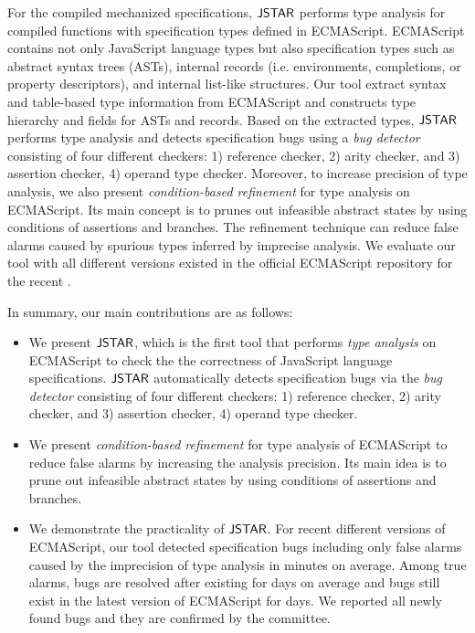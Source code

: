 For the compiled mechanized specifications, $\textsf{JSTAR}$ performs type analysis for
compiled functions with specification types defined in ECMAScript.  ECMAScript
contains not only JavaScript language types but also specification types such as
abstract syntax trees (ASTs), internal records (i.e. environments, completions,
or property descriptors), and internal list-like structures.  Our tool extract
syntax and table-based type information from ECMAScript and constructs type
hierarchy and fields for ASTs and records.  Based on the extracted types,
$\textsf{JSTAR}$ performs type analysis and detects specification bugs using a
\textit{bug detector} consisting of four different checkers: 1) reference
checker, 2) arity checker, and 3) assertion checker, 4) operand type checker.
Moreover, to increase precision of type analysis, we also present
\textit{condition-based refinement} for type analysis on ECMAScript. Its main
concept is to prunes out infeasible abstract states by using conditions of
assertions and branches.  The refinement technique can reduce false alarms
caused by spurious types inferred by imprecise analysis.  We evaluate our tool
with all  different versions existed in the official ECMAScript
repository for the recent .

In summary, our main contributions are as follows:
\begin{itemize}
  \item We present $\textsf{JSTAR}$, which is the first tool that performs \textit{type
    analysis} on ECMAScript to check the the correctness of JavaScript language
    specifications.  $\textsf{JSTAR}$ automatically detects specification bugs via the
    \textit{bug detector} consisting of four different checkers: 1) reference
    checker, 2) arity checker, and 3) assertion checker, 4) operand type
    checker.
  \item We present \textit{condition-based refinement} for type analysis of
    ECMAScript to reduce false alarms by increasing the analysis precision.  Its
    main idea is to prune out infeasible abstract states by using conditions of
    assertions and branches.
  \item We demonstrate the practicality of $\textsf{JSTAR}$. For recent 
    different versions of ECMAScript, our tool detected 
    specification bugs including only  false alarms caused by the
    imprecision of type analysis in  minutes on average.  Among
     true alarms,  bugs are resolved after existing for
     days on average and  bugs still exist in the latest
    version of ECMAScript for  days.  We reported all 
    newly found bugs and they are confirmed by the committee.
\end{itemize}
